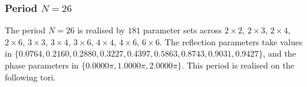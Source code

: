 \par
\subsubsection{Period $N = 26$}
The period $N=26$ is realised by $181$ parameter sets across $2\times2$, $2\times3$, $2\times4$, $2\times6$, $3\times3$, $3\times4$, $3\times6$, $4\times4$, $4\times6$, $6\times6$. The reflection parameters take values in $\{0.0764, 0.2160, 0.2880, 0.3227, 0.4397, 0.5863, 0.8743, 0.9031, 0.9427\}$, and the phase parameters in $\{0.0000\pi, 1.0000\pi, 2.0000\pi\}$. This period is realised on the following tori.
